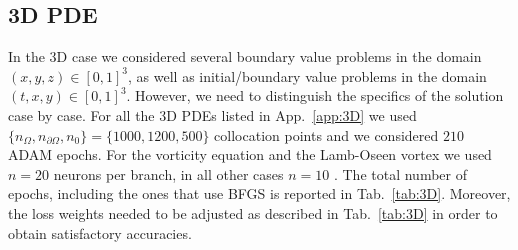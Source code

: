 \documentclass{article}
\begin{document}
\subsection{3D PDE}
\label{sec:3DPDEs}

In the 3D case we considered several boundary value problems in the domain $(x, y, z) \in [0,1]^3$, as well as initial/boundary value problems in the domain $(t,x,y) \in [0,1]^3$. However, we need to distinguish the specifics of the solution case by case. For all the 3D PDEs listed in App.~\ref{app:3D} we used $\{ n_{\Omega},n_{\partial\Omega},n_{0}\}=\{ 1000,1200,500\}$ collocation points and we considered $210$ ADAM epochs. 
For the vorticity equation and the Lamb-Oseen vortex we used $n = 20$ neurons per branch, in all other cases $n = 10$ .
The total number of epochs, including the ones that use BFGS is reported in Tab.~\ref{tab:3D}. Moreover, the loss weights needed to be adjusted as described in Tab.~\ref{tab:3D} in order to obtain satisfactory accuracies. \\
\end{document}
